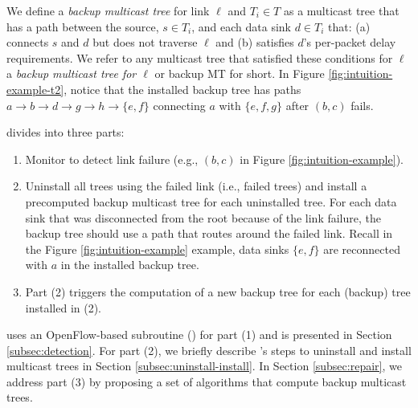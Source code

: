 We define a \emph{backup multicast tree} for link $\ell$ and $T_i \in T$ as a multicast tree that has 
a path between the source, $s \in T_i$, and each data sink $d \in T_i$ that: (a) connects $s$ and $d$ but does not traverse $\ell$ and 
(b) satisfies $d$'s per-packet delay requirements.  We refer to any multicast tree that satisfied these conditions for $\ell$ a \emph{backup multicast tree for $\ell$} or backup MT for short.
In Figure \ref{fig:intuition-example-t2}, notice that the installed backup tree has paths $a \rightarrow b \rightarrow d \rightarrow g \rightarrow h \rightarrow \{e,f\}$ connecting $a$ with $\{e,f,g\}$ after $(b,c)$ fails.




\mdr divides into three parts: 
\vspace{-0.2cm}
\begin{enumerate}
	\item Monitor to detect link failure (e.g., $(b,c)$ in Figure \ref{fig:intuition-example}).
	\item Uninstall all trees using the failed link (i.e., failed trees) and install a precomputed backup multicast tree for each uninstalled tree. For each data sink that was disconnected from the root because of the link failure, the
	 backup tree should use a path that routes around the failed link.  Recall in the Figure \ref{fig:intuition-example} example, data sinks $\{e,f\}$ are reconnected with $a$ in the installed backup tree.
	
	\item Part (2) triggers the computation of a new backup tree for each (backup) tree installed in (2).  %
\end{enumerate}
\vspace{-0.3cm}
\mdr uses an OpenFlow-based subroutine (\fls) for part (1) and is presented in Section \ref{subsec:detection}.  For part (2), we briefly describe \mdrs's steps to uninstall and install multicast trees in Section \ref{subsec:uninstall-install}. 
In Section \ref{subsec:repair}, we address part (3)  by proposing a set of algorithms that compute backup multicast trees. 


